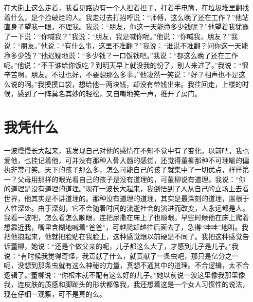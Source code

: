 \documentclass[12pt,oneside]{book}
\begin{document}
在大街上这么走着，我看见路边有一个人担着担子，打着手电筒，在垃圾堆里翻找着什么，是个捡破烂的人。我走过去打招呼说：``师傅，这么晚了还在工作？''他站直身子望我一眼，不理我。我说：``朋友，你这一天能挣多少钱呢？''他望着我犹豫了一下说：``你喊我？''我说：``朋友，我是喊你呢。''他说：``你喊我，朋友？''我说：``朋友。''他说：``有什么事，这里不准翻？''我说：``谁说不准翻？问你这一天能挣多少钱？''他迟疑地说：``多少钱？一口饭钱吧。''我说：``都这么晚了还在工作呢。''他说：``不干谁给你饭吃？到明天早上就没我的份了，别人来过了。''我说：``很辛苦啊，朋友。不过也好，不要想那么多事。''他凄然一笑说：``好？相声也不是这么说的啊。''我摸摸口袋，想给他一两块钱，却没有带钱出来。我往回走，上楼的时候，感到了一阵莫名其妙的轻松，又自嘲地笑一声，推开了房门。


\chapter{我凭什么}

一波慢慢长大起来，我发现自己对他的感情在不知不觉中有了变化。以前吧，我也爱他，也挂记着他，可并没有那种入骨入髓的感觉，还觉得董柳那种不可理喻的偏执非常可笑。天下的孩子那么多，怎么可能自己的孩子就集中了一切优点，样样第一？父母用那样的眼光看自己的孩子是没有道理的，可董柳说有道理。我说：``你的道理是没有道理的道理。''现在一波长大起来，我倒悟到了人从自己的立场上去看世界，他其实是不讲道理的。那种没有道理的道理，其实是最深刻的道理，置根于人性深处。由于深刻，它不会随着时间的流逝社会的演进而改变，人永远都是人。我看一波吧，怎么看怎么顺眼，连把尿撒在床上了也顺眼。早些时候他在床上爬着想靠近我，嘴里含糊地喊着``爸爸''，可越爬却越往后面去了，急得``哇哇''地叫。我把他抱起来，他就把脸贴在我脸上，这种感觉跟以前硬是不同了。我把这种感觉告诉董柳，她说：``还是个做父亲的呢，儿子都这么大了，才感到儿子是儿子。''我说：``有时候我觉得奇怪，我贡献了什么，就贡献了一条虫吧，那只是亿分之一呢，没想到那条虫就有这么神秘的力量，真想不通其中的道理。不合逻辑，太不合逻辑了。''董柳说：``你根本就不配有这么好的儿子。''她以前说一波这里像我那里像我，连皮肤的质感和脚趾头的形状都像我，我还想着这是一个女人习惯性的说法，现在仔细一观察，可不是真的么。
\end{document}
